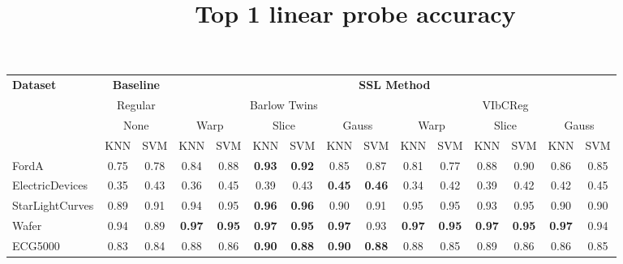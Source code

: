 \documentclass[../../thesis.tex]{subfiles}
\begin{document}
\begin{table}[H]
    \centering
    \title{Top 1 linear probe accuracy}
    \begin{adjustbox}{width=\textwidth}
    \begin{tabular}{lcc|cc|cc|cc|cc|cc|cc} %
        \toprule
        \multirow{4}{*}{\textbf{Dataset}} & \multicolumn{2}{c}{\textbf{Baseline}} & \multicolumn{12}{c}{\textbf{SSL Method}} \\
                                            \cmidrule(lr){2-3} \cmidrule(lr){4-15}
                                          & \multicolumn{2}{c}{Regular}           & \multicolumn{6}{c}{Barlow Twins}                                                 &  \multicolumn{6}{c}{VIbCReg} \\
                                          \cmidrule(lr){2-3} \cmidrule(lr){4-9} \cmidrule(lr){10-15}
                                          &   \multicolumn{2}{c}{None}            & \multicolumn{2}{c}{Warp}  & \multicolumn{2}{c}{Slice} & \multicolumn{2}{c}{Gauss} & \multicolumn{2}{c}{Warp} & \multicolumn{2}{c}{Slice} & \multicolumn{2}{c}{Gauss} \\
                                          \cmidrule(lr){2-3} \cmidrule(lr){4-5} \cmidrule(lr){6-7} \cmidrule(lr){8-9} \cmidrule(lr){10-11} \cmidrule(lr){12-13}\cmidrule(lr){14-15}
                                          & KNN & SVM                               & KNN & SVM                  & KNN & SVM                & KNN & SVM                 & KNN & SVM                 & KNN & SVM                 & KNN & SVM   \\
        \midrule
        FordA                   & 0.75 & 0.78 & 0.84 & 0.88 & \textbf{0.93} & \textbf{0.92} & 0.85 & 0.87 & 0.81 & 0.77 & 0.88 & 0.90 & 0.86 & 0.85 \\
        ElectricDevices         & 0.35 & 0.43 & 0.36 & 0.45 & 0.39 & 0.43 & \textbf{0.45} & \textbf{0.46} & 0.34 & 0.42 & 0.39 & 0.42 & 0.42 & 0.45 \\
        StarLightCurves         & 0.89 & 0.91 & 0.94 & 0.95 & \textbf{0.96} & \textbf{0.96} & 0.90 & 0.91 & 0.95 & 0.95 & 0.93 & 0.95 & 0.90 & 0.90 \\
        Wafer                   & 0.94 & 0.89 &\textbf{ 0.97} & \textbf{0.95} & \textbf{0.97} & \textbf{0.95} & \textbf{0.97} & 0.93 & \textbf{0.97} & \textbf{0.95} & \textbf{0.97} & \textbf{0.95} & \textbf{0.97} & 0.94 \\
        ECG5000                 & 0.83 & 0.84 & 0.88 & 0.86 & \textbf{0.90} & \textbf{0.88} & \textbf{0.90} & \textbf{0.88} & 0.88 & 0.85 & 0.89 & 0.86 & 0.86 & 0.85 \\

\end{tabular}
\end{adjustbox}
\end{table}
\end{document}
